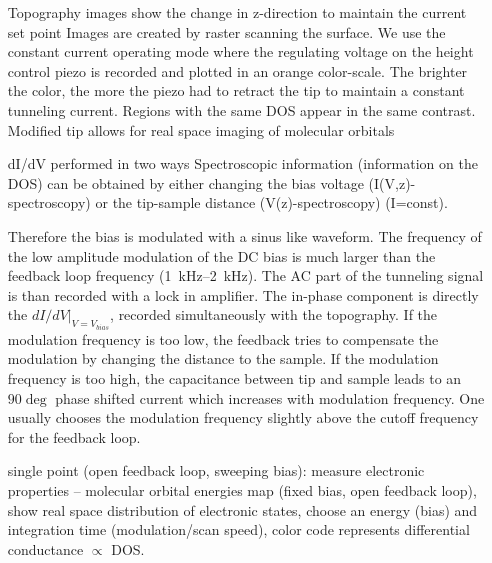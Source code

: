 \begin{itemize}
	\item[Topography images] show the change in z-direction to maintain the current set point
	Images are created by raster scanning the surface. We use the constant current operating mode where the regulating voltage on the height control piezo is recorded and plotted in an orange color-scale. The brighter the color, the more the piezo had to retract the tip to maintain a constant tunneling current. Regions with the same DOS appear in the same contrast.
	\subitem Modified tip allows for real space imaging of molecular orbitals
	\item[dI/dV] performed in two ways
	\subitem Spectroscopic information (information on the DOS) can be obtained by either changing the bias voltage (I(V,z)-spectroscopy) or the tip-sample distance (V(z)-spectroscopy) (I=const).  
	
	Therefore the bias is modulated with a sinus like waveform. The frequency of the low amplitude modulation of the DC bias is much larger than the feedback loop frequency (\SIrange{1}{2}{\kilo \hertz}). The AC part of the tunneling signal is than recorded with a lock in amplifier. The in-phase component is directly the $dI/dV|_{V=V_{bias}}$, recorded simultaneously with the topography. If the modulation frequency is too low, the feedback tries to compensate the modulation by changing the distance to the sample.	If the modulation frequency is too high, the capacitance between tip and sample leads to an $90\deg$ phase shifted current which increases with modulation frequency. One usually chooses the modulation frequency slightly above the cutoff frequency for the feedback loop.
	
	\subitem single point (open feedback loop, sweeping bias): measure electronic properties – molecular orbital energies
	\subitem map (fixed bias, open feedback loop), show real space distribution of electronic states, choose an energy (bias) and integration time (modulation/scan speed), color code represents differential conductance $\propto$ DOS.
\end{itemize}

